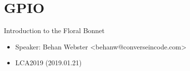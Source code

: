 \section{GPIO}

\begin{frame}
   {Introduction to the Floral Bonnet}
   \begin{itemize}
      \item Speaker: Behan Webster \textless behanw@converseincode.com\textgreater
      \item LCA2019 (2019.01.21)
   \end{itemize}
\end{frame}

\cprotect{}

